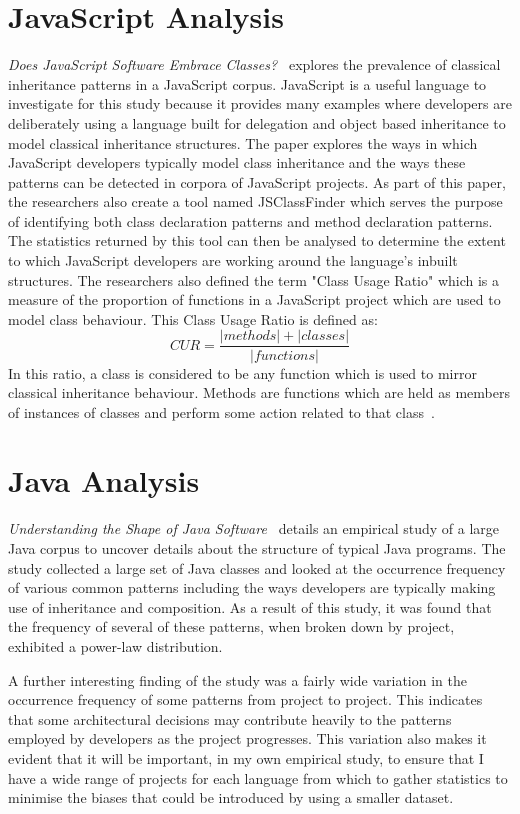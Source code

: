 \section{JavaScript Analysis}
\textit{Does JavaScript Software Embrace Classes?~\cite{JSClassFinder}} explores the prevalence of classical inheritance patterns in a JavaScript corpus. JavaScript is a useful language to investigate for this study because it provides many examples where developers are deliberately using a language built for delegation and object based inheritance to model classical inheritance structures. The paper explores the ways in which JavaScript developers typically model class inheritance and the ways these patterns can be detected in corpora of JavaScript projects. As part of this paper, the researchers also create a tool named JSClassFinder which serves the purpose of identifying both class declaration patterns and method declaration patterns. The statistics returned by this tool can then be analysed to determine the extent to which JavaScript developers are working around the language's inbuilt structures. The researchers also defined the term "Class Usage Ratio" which is a measure of the proportion of functions in a JavaScript project which are used to model class behaviour. This Class Usage Ratio is defined as:
\[CUR = \frac{\left\vert methods \right\vert + \left\vert classes \right\vert}{\left\vert functions \right\vert}\]
In this ratio, a class is considered to be any function which is used to mirror classical inheritance behaviour. Methods are functions which are held as members of instances of classes and perform some action related to that class~\cite{JSClassFinder}.

\section{Java Analysis}
\textit{Understanding the Shape of Java Software~\cite{ShapeOfJava}} details an empirical study of a large Java corpus to uncover details about the structure of typical Java programs. The study collected a large set of Java classes and looked at the occurrence frequency of various common patterns including the ways developers are typically making use of inheritance and composition. As a result of this study, it was found that the frequency of several of these patterns, when broken down by project, exhibited a power-law distribution.
\newline

A further interesting finding of the study was a fairly wide variation in the occurrence frequency of some patterns from project to project. This indicates that some architectural decisions may contribute heavily to the patterns employed by developers as the project progresses. This variation also makes it evident that it will be important, in my own empirical study, to ensure that I have a wide range of projects for each language from which to gather statistics to minimise the biases that could be introduced by using a smaller dataset.
\newline

